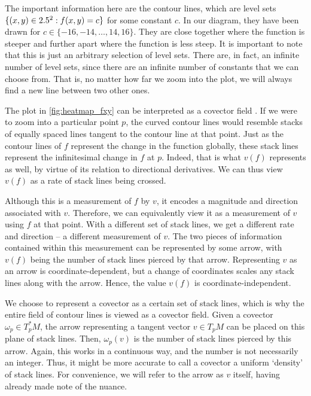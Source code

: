\documentclass[a4paper,12pt]{article}
\begin{document}
The important information here are the contour lines, which are level sets $\{(x,y) \in 2.5^2 : f(x,y) = c\}$ for some constant $c$.
In our diagram, they have been drawn for $c \in \{-16, -14, \ldots, 14, 16\}$.
They are close together where the function is steeper and further apart where the function is less steep.
It is important to note that this is just an arbitrary selection of level sets.
There are, in fact, an infinite number of level sets, since there are an infinite number of constants that we can choose from.
That is, no matter how far we zoom into the plot, we will always find a new line between two other ones.

The plot in \cref{fig:heatmap_fxy} can be interpreted as a covector field \cite{covector_visualization}.
If we were to zoom into a particular point $p$, the curved contour lines would resemble stacks of equally spaced lines tangent to the contour line at that point.
Just as the contour lines of $f$ represent the change in the function globally, these stack lines represent the infinitesimal change in $f$ at $p$.
Indeed, that is what $v(f)$ represents as well, by virtue of its relation to directional derivatives.
We can thus view $v(f)$ as a rate of stack lines being crossed.

Although this is a measurement of $f$ by $v$, it encodes a magnitude and direction associated with $v$.
Therefore, we can equivalently view it as a measurement of $v$ using $f$ at that point.
With a different set of stack lines, we get a different rate and direction -- a different measurement of $v$.
The two pieces of information contained within this measurement can be represented by some arrow, with $v(f)$ being the number of stack lines pierced by that arrow.
Representing $v$ as an arrow is coordinate-dependent, but a change of coordinates scales any stack lines along with the arrow.
Hence, the value $v(f)$ is coordinate-independent.

We choose to represent a covector as a certain set of stack lines, which is why the entire field of contour lines is viewed as a covector field.
Given a covector $\omega_p \in T^*_p M$, the arrow representing a tangent vector $v \in T_p M$ can be placed on this plane of stack lines.
Then, $\omega_p(v)$ is the number of stack lines pierced by this arrow.
Again, this works in a continuous way, and the number is not necessarily an integer.
Thus, it might be more accurate to call a covector a uniform `density' of stack lines.
For convenience, we will refer to the arrow as $v$ itself, having already made note of the nuance.
\end{document}
